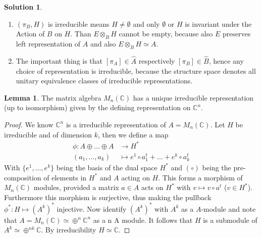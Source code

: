 \documentclass[a4paper]{article}
\theoremstyle{definition}
\theoremstyle{definition}
\theoremstyle{definition}
\theoremstyle{theorem}
\theoremstyle{theorem}
\theoremstyle{theorem}
\newtheorem{lemma}{Lemma}
\theoremstyle{definition}
\newtheorem{solution}{Solution}
\begin{document}
\begin{solution}
    \
    \begin{enumerate}
        \item $(\pi _B, H)$ is irreducible means $H \neq \emptyset$ and only $\emptyset$ or $H$
            is invariant under the Action of $B$ on $H$.
            Than $E\otimes _B H$ cannot be empty, because also $E$ preserves left representation of $A$
            and also $E\otimes _B H \simeq A$.
        \item The important thing is that $[\pi _A] \in \hat{A}$ respectively $[\pi _B] \in \hat{B}$,
            hence any choice of representation is irreducible, because the structure space denotes all unitary
            equivalence classes of irreducible representations.
    \end{enumerate}
\end{solution}

    \begin{lemma}
    The matrix algebra $M_n(\mathbb{C})$ has a unique irreducible representation (up to isomorphism)
    given by the defining representation on $\mathbb{C}^n$.
\end{lemma}
\begin{proof}
    We know $\mathbb{C}^n$ is a irreducible representation of $A= M_n(\mathbb{C})$. Let $H$ be irreducible
    and of dimension $k$, then we define a map
    \begin{align*}
        \phi : A\oplus...\oplus A &\rightarrow H^* \\
        (a_1,...,a_k)             &\mapsto e^1\circ a_1^t+...+e^k\circ a_k^t
    \end{align*}
    With $\{e^1,...,e^k\}$ being the basis of the dual space $H^*$ and $(\circ)$ being the pre-composition
    of elements in $H^*$ and $A$ acting on $H$. This forms a morphism of $M_n(\mathbb{C})$ modules,
    provided a matrix $a \in A$ acts on $H^*$ with $v\mapsto v\circ a^t$ ($v\in H^*$).
    Furthermore this morphism is surjective, thus making the pullback $\phi ^*:H\mapsto (A^k)^*$ injective.
    Now identify $(A^k)^*$ with $A^k$ as a $A$-module and note that
    $A=M_n(\mathbb{C}) \simeq \oplus ^n \mathbb{C}^n$ as a n A module.
    It follows that $H$ is a submodule of $A^k \simeq \oplus ^{nk}\mathbb{C}$. By irreducibility
    $H \simeq \mathbb{C}$.
\end{proof}
\end{document}
